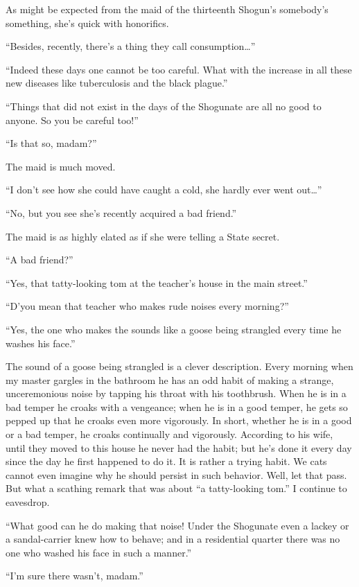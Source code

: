 \documentclass{book}
\begin{document}
As might be expected from the maid of the thirteenth Shogun's somebody's
something, she's quick with honorifics.

``Besides, recently, there's a thing they call consumption\ldots{}''

``Indeed these days one cannot be too careful. What with the increase in
all these new diseases like tuberculosis and the black plague.''

``Things that did not exist in the days of the Shogunate are all no good
to anyone. So you be careful too!''

``Is that so, madam?''

The maid is much moved.

``I don't see how she could have caught a cold, she hardly ever went
out\ldots{}''

``No, but you see she's recently acquired a bad friend.''

The maid is as highly elated as if she were telling a State secret.

``A bad friend?''

``Yes, that tatty-looking tom at the teacher's house in the main
street.''

``D'you mean that teacher who makes rude noises every morning?''

``Yes, the one who makes the sounds like a goose being strangled every
time he washes his face.''

The sound of a goose being strangled is a clever description. Every
morning when my master gargles in the bathroom he has an odd habit of
making a strange, unceremonious noise by tapping his throat with his
toothbrush. When he is in a bad temper he croaks with a vengeance; when
he is in a good temper, he gets so pepped up that he croaks even more
vigorously. In short, whether he is in a good or a bad temper, he croaks
continually and vigorously. According to his wife, until they moved to
this house he never had the habit; but he's done it every day since the
day he first happened to do it. It is rather a trying habit. We cats
cannot even imagine why he should persist in such behavior. Well, let
that pass. But what a scathing remark that was about ``a tatty-looking
tom.'' I continue to eavesdrop.

``What good can he do making that noise! Under the Shogunate even a
lackey or a sandal-carrier knew how to behave; and in a residential
quarter there was no one who washed his face in such a manner.''

``I'm sure there wasn't, madam.''
\end{document}
